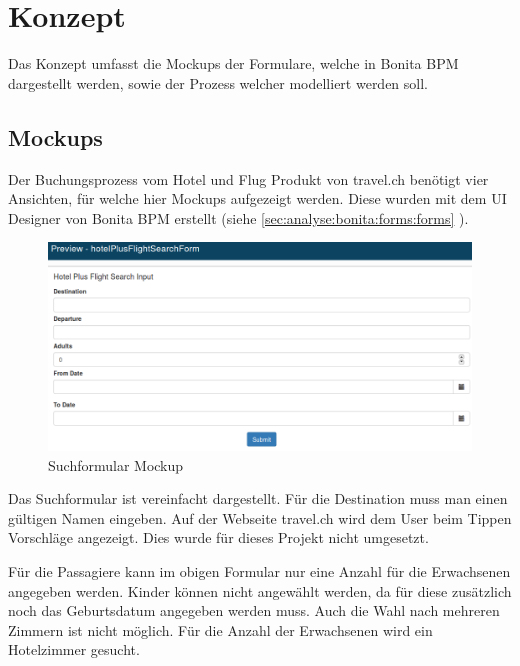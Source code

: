 
\chapter{Konzept}
\label{sec:konzept}
Das Konzept umfasst die Mockups der Formulare, welche in Bonita BPM dargestellt werden, sowie der Prozess welcher modelliert werden soll.

\section{Mockups}
\label{sec:konzept:mockups}
Der Buchungsprozess vom Hotel und Flug Produkt von travel.ch benötigt vier Ansichten, für welche hier Mockups aufgezeigt werden.
Diese wurden mit dem UI Designer von Bonita BPM erstellt (siehe \cref{sec:analyse:bonita:forms:forms} ).

\begin{figure}[H]
	\centering
	\includegraphics[width=1\textwidth]{images/forms-search.png}
	\caption{Suchformular Mockup}
	\label{fig:konzept:mockups:search}
\end{figure}

Das Suchformular ist vereinfacht dargestellt. Für die Destination muss man einen gültigen Namen eingeben. Auf der Webseite travel.ch wird dem User beim Tippen Vorschläge angezeigt. Dies wurde für dieses Projekt nicht umgesetzt.

Für die Passagiere kann im obigen Formular nur eine Anzahl für die Erwachsenen angegeben werden. Kinder können nicht angewählt werden, da für diese zusätzlich noch das Geburtsdatum angegeben werden muss. Auch die Wahl nach mehreren Zimmern ist nicht möglich. Für die Anzahl der Erwachsenen wird ein Hotelzimmer gesucht.


